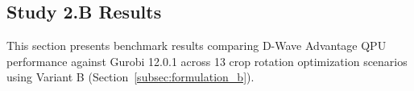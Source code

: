 

\subsection{Study 2.B Results}
\label{subsec:quantum_advantage}

This section presents benchmark results comparing D-Wave Advantage QPU performance against Gurobi 12.0.1 across 13 crop rotation optimization scenarios using Variant B (Section~\ref{subsec:formulation_b}).




